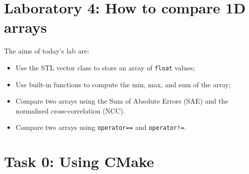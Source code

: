 \documentclass[english,a4paper,12pt,oneside]{article}
\begin{document}

\section*{Laboratory 4: How to compare 1D arrays}

%
%
%
%    
%    

The aims of today's lab are:
\begin{itemize}
	\item Use the STL vector class to store an array of \verb+float+ values;
	\item Use built-in functions to compute the min, max, and sum of the array;
	\item Compare two arrays using the Sum of Absolute Errors (SAE) and the normalised cross-correlation (NCC).
	\item Compare two arrays using \verb+operator==+ and \verb+operator!=+.
\end{itemize}

\section*{Task 0: Using CMake}
\end{document}
